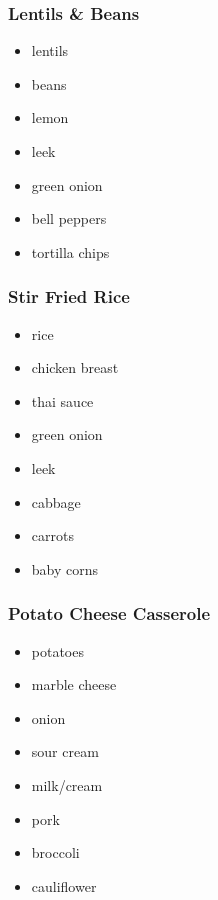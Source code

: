 \documentclass[11pt, a4paper]{article}
\begin{document}
\subsubsection{Lentils \& Beans}
\vspace{1pc}
\begin{itemize}
\item lentils
\item beans
\item lemon
\item leek
\item green onion
\item bell peppers
\item tortilla chips
\end{itemize}




\subsubsection{Stir Fried Rice}
\vspace{1pc}
\begin{itemize}
\item rice
\item chicken breast
\item thai sauce
\item green onion
\item leek
\item cabbage
\item carrots
\item baby corns
\end{itemize}



\subsubsection{Potato Cheese Casserole}
\vspace{1pc}
\begin{itemize}
\item potatoes
\item marble cheese
\item onion
\item sour cream
\item milk/cream
\item pork
\item broccoli
\item cauliflower
\end{itemize}
\end{document}
